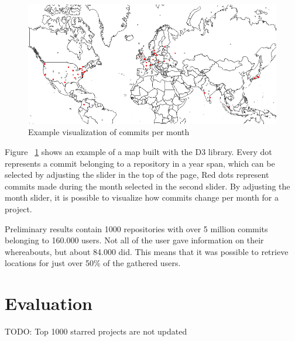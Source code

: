 \documentclass[acmtog, authorversion]{acmart}
\begin{document}
\begin{figure}
\includegraphics[scale=0.4]{images/d3-example-rails.PNG}
\caption{Example visualization of commits per month}
\label{fig:commits-period}
\end{figure}

Figure ~\ref{fig:commits-period} shows an example of a map built with the D3 library.
Every dot represents a commit belonging to a repository in a year span, which can be selected by adjusting the slider in the top of the page,
Red dots represent commits made during the month selected in the second slider.
By adjusting the month slider, it is possible to visualize how commits change per month for a project.

Preliminary results contain 1000 repositories with over 5 million commits belonging to 160.000 users.
Not all of the user gave information on their whereabouts, but about 84.000 did.
This means that it was possible to retrieve locations for just over 50\% of the gathered users.


\section{Evaluation}
TODO: Top 1000 starred projects are not updated



\end{document}
